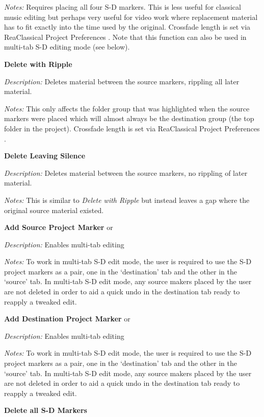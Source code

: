 \documentclass[10pt,american]{article}
\begin{document}
\emph{Notes:} Requires placing all four S-D markers. This is less useful for
classical music editing but perhaps very useful for video work where replacement
material has to fit exactly into the time used by the original. Crossfade length
is set via ReaClassical Project Preferences  . Note that this function
can also be used in multi-tab S-D editing mode (see below).

\textbf{Delete with Ripple }\keys{\backspace}

\emph{Description: }Deletes material between the source markers, rippling all
later material.

\emph{Notes:} This only affects the folder group that was highlighted when the
source markers were placed which will almost always be the destination group
(the top folder in the project). Crossfade length is set via ReaClassical
Project Preferences  .

\textbf{Delete Leaving Silence }\keys{\ctrl+\backspace}

\emph{Description:} Deletes material between the source markers, no rippling of
later material.

\emph{Notes: }This is similar to \emph{Delete with Ripple} but instead leaves a
gap where the original source material existed.

\textbf{Add Source Project Marker } or 

\emph{Description:} Enables multi-tab editing

\emph{Notes: }To work in multi-tab S-D edit mode, the user is required to use
the S-D project markers as a pair, one in the `destination' tab and the other in
the `source' tab. In multi-tab S-D edit mode, any source makers placed by the
user are not deleted in order to aid a quick undo in the destination tab ready
to reapply a tweaked edit.

\textbf{Add Destination Project Marker } or

\emph{Description:} Enables multi-tab editing

\emph{Notes: }To work in multi-tab S-D edit mode, the user is required to use
the S-D project markers as a pair, one in the `destination' tab and the other in
the `source' tab. In multi-tab S-D edit mode, any source makers placed by the
user are not deleted in order to aid a quick undo in the destination tab ready
to reapply a tweaked edit.

\textbf{Delete all S-D Markers }\keys{\ctrl+\del}
\end{document}
